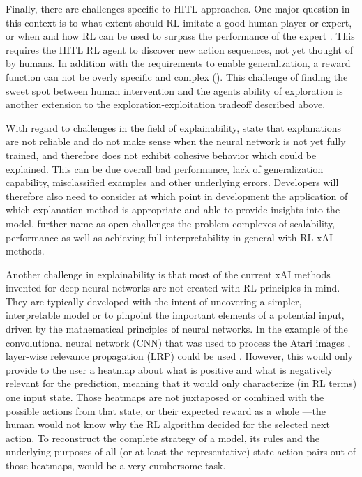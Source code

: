 \documentclass[twoside,11pt]{article}
\begin{document}
\begin{enumerate}
Finally, there are challenges specific to HITL approaches. One major question in this context is to what extent should RL imitate a good human player or expert, or when and how RL can be used to surpass the performance of the expert \citep{Abel:2017:AgentAgnosticHumanInTheLoopRL}. This requires the HITL RL agent to discover new action sequences, not yet thought of by humans. In addition with the requirements to enable generalization, a reward function can not be overly specific and complex (\citep{LiuAbbeel:2020:UnsupervisedActivePreTraining}). This challenge of finding the sweet spot between human intervention and the agents ability of exploration is another extension to the exploration-exploitation tradeoff described above. 

With regard to challenges in the field of explainability, \citet{GlanoisEtAl:2021:SurveyInterpretableRL} state that explanations are not reliable and do not make sense when the neural network is not yet fully trained, and therefore does not exhibit cohesive behavior which could be explained. This can be due overall bad performance, lack of generalization capability, misclassified examples and other underlying errors. Developers will therefore also need to consider at which point in development the application of which explanation method is appropriate and able to provide insights into the model. \citet{GlanoisEtAl:2021:SurveyInterpretableRL} further name as open challenges the problem complexes of scalability, performance as well as achieving full interpretability in general with RL xAI methods.

Another challenge in explainability is that most of the current xAI methods invented for deep neural networks are not created with RL principles in mind. They are typically developed with the intent of uncovering a simpler, interpretable model or to pinpoint the important elements of a potential input, driven by the mathematical principles of neural networks. In the example of the convolutional neural network (CNN) that was used to process the Atari images \citep{Mnih:2013:PlayingAtariDeepRL}, layer-wise relevance propagation (LRP) could be used \citep{Bach:2015:LayerWiseRelevancePropagation,Alber:2019:Innvestigate}. However, this would only provide to the user a heatmap about what is positive and what is negatively relevant for the prediction, meaning that it would only characterize (in RL terms) one input state. Those heatmaps are not juxtaposed or combined with the possible actions from that state, or their expected reward as a whole ---the human would not know why the RL algorithm decided for the selected next action. To reconstruct the complete strategy of a model, its rules and the underlying purposes of all (or at least the representative) state-action pairs out of those heatmaps, would be a very cumbersome task. 


\end{enumerate}
\end{document}
